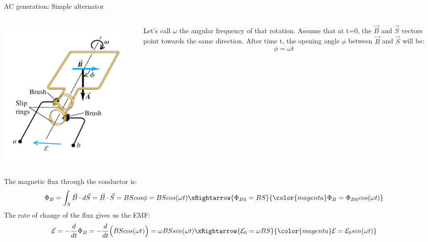 %
%
%

\begin{frame}{AC generation: Simple alternator}

\begin{columns}
  \begin{column}{0.25\textwidth}
    \begin{center}
       \includegraphics[width=0.95\textwidth]{./images/schematics/simple_alternator.png}\\
     \end{center}
  \end{column}
  \begin{column}{0.75\textwidth}
      Let’s call $\omega$ the angular frequency of that rotation.
      Assume that at t=0, the $\vec{B}$ and $\vec{S}$ vectors point towards the same direction.
      After time t, the opening angle $\phi$ between $\vec{B}$ and $\vec{S}$ will be:
      \begin{equation*}
          \phi = \omega t
      \end{equation*}
  \end{column}
\end{columns}

The magnetic flux through the conductor is:
\begin{equation*}
     \Phi_B = \int_{S} \vec{B} \cdot d\vec{S} = \vec{B} \cdot \vec{S} = B S cos\phi = B S cos(\omega t)
      \xRightarrow{{\Phi_B}_{0} = BS}
      {\color{magenta}
          \Phi_B =  {\Phi_B}_{0} cos(\omega t)
     }
\end{equation*}
The rate of change of the flux gives us the EMF:
\begin{equation*}
     \mathcal{E} = - \frac{d}{dt} \Phi_B = - \frac{d}{dt} \Big(  B S cos(\omega t) \Big) = \omega B S  sin(\omega t)
     \xRightarrow{\mathcal{E}_0 =  \omega B S}
      {\color{magenta}
        \mathcal{E} = \mathcal{E}_0 sin(\omega t)
      }
\end{equation*}


\end{frame}
